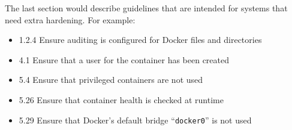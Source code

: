 \hfill

The last section would describe guidelines that are intended for systems that need extra hardening. For example:
\begin{itemize}
    \item 1.2.4 Ensure auditing is configured for Docker files and directories
    \item 4.1 Ensure that a user for the container has been created
    \item 5.4 Ensure that privileged containers are not used
    \item 5.26 Ensure that container health is checked at runtime
    \item 5.29 Ensure that Docker's default bridge ``\lstinline{docker0}'' is not used
\end{itemize}
